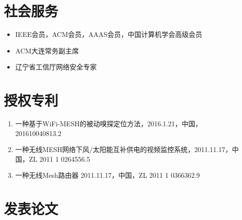 \documentclass{resume}
\begin{document}
\section{社会服务}
\begin{itemize}[parsep=0.2ex]
  \item IEEE会员，ACM会员，AAAS会员，中国计算机学会高级会员
  \item ACM大连常务副主席
  \item 辽宁省工信厅网络安全专家
\end{itemize}

\section{授权专利}
\begin{enumerate}[parsep=0.2ex]
\item 一种基于WiFi-MESH的被动嗅探定位方法，2016.1.21，中国，201610040813.2
\item 一种无线MESH网络下风/太阳能互补供电的视频监控系统，2011.11.17，中国，ZL 2011 1 0264556.5
\item 一种无线Mesh路由器 2011.11.17，中国，ZL 2011 1 0366362.9
\end{enumerate}

\section{发表论文}
\begingroup
\renewcommand{\section}[2]{}%
\nocite{*}

%
% 
 


\endgroup
%
%
\end{document}
